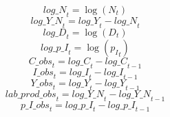 \begin{dmath}
{log\_N}_{t}=\log\left({{N}}_{t}\right)
\end{dmath}
\begin{dmath}
{log\_Y\_N}_{t}={log\_Y}_{t}-{log\_N}_{t}
\end{dmath}
\begin{dmath}
{log\_D}_{t}=\log\left({{D}}_{t}\right)
\end{dmath}
\begin{dmath}
{log\_p\_I}_{t}=\log\left({{p_I}}_{t}\right)
\end{dmath}
\begin{dmath}
{C\_obs}_{t}={log\_C}_{t}-{log\_C}_{t-1}
\end{dmath}
\begin{dmath}
{I\_obs}_{t}={log\_I}_{t}-{log\_I}_{t-1}
\end{dmath}
\begin{dmath}
{Y\_obs}_{t}={log\_Y}_{t}-{log\_Y}_{t-1}
\end{dmath}
\begin{dmath}
{lab\_prod\_obs}_{t}={log\_Y\_N}_{t}-{log\_Y\_N}_{t-1}
\end{dmath}
\begin{dmath}
{p\_I\_obs}_{t}={log\_p\_I}_{t}-{log\_p\_I}_{t-1}
\end{dmath}

